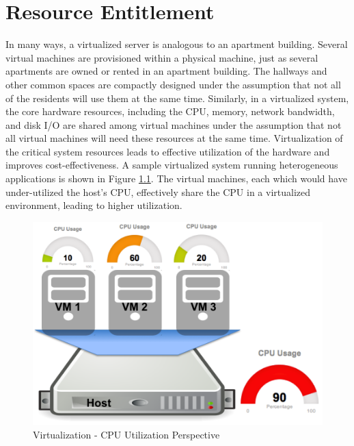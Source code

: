 \chapter{Resource Entitlement}


In many ways, a virtualized server is analogous to an apartment building. Several virtual machines are provisioned within a physical machine, just as several apartments are owned or rented in an apartment building. The hallways and other common spaces are compactly designed under the assumption that not all of the residents will use them at the same time. Similarly, in a virtualized system, the core hardware resources, including the CPU, memory, network bandwidth, and disk I/O are shared among virtual machines under the assumption that not all virtual machines will need these resources at the same time. Virtualization of the critical system resources leads to effective utilization of the hardware and improves cost-effectiveness. A sample virtualized system running heterogeneous applications is shown in Figure \ref{fig:resourceutil}. The virtual machines, each which would have under-utilized the host's CPU, effectively share the CPU in a virtualized environment, leading to higher utilization.  

\begin{figure}[htbp]
\centering
\includegraphics[width=130mm]{resourceutil.png}
\caption{Virtualization - CPU Utilization Perspective}
\label{fig:resourceutil}
\end{figure}

